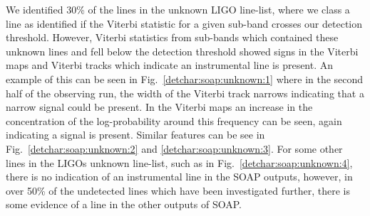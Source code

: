We identified 30\% of the lines in the unknown \gls{LIGO} line-list, where we class a line as identified if the Viterbi
statistic for a given sub-band crosses our detection threshold.  However, Viterbi statistics
from sub-bands which contained these unknown lines and fell below the detection
threshold showed signs in the Viterbi maps and Viterbi tracks which indicate an
instrumental line is present. An example of this can be seen in
Fig.~\ref{detchar:soap:unknown:1} where in the second half of the observing
run, the width of the Viterbi track narrows indicating that a narrow signal
could be present. In the Viterbi maps an increase in the concentration of the
log-probability around this frequency can be seen, again indicating a signal is
present. Similar features can be see in Fig.~\ref{detchar:soap:unknown:2} and
\ref{detchar:soap:unknown:3}.  For some other lines in the \glspl{LIGO} unknown
line-list, such as in Fig.~\ref{detchar:soap:unknown:4}, there is no indication
of an instrumental line in the SOAP outputs, however, in over 50\% of the
undetected lines which have been investigated further, there is some evidence
of a line in the other outputs of SOAP.~
%
